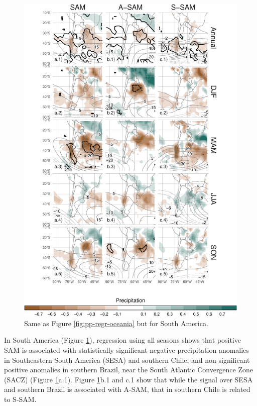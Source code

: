 \documentclass[smallextended]{svjour3}       %
\begin{document}
\begin{figure}
\includegraphics{pp-regr-america-1} \caption{Same as Figure \ref{fig:pp-regr-oceania} but for South America.}\label{fig:pp-regr-america}
\end{figure}

In South America (Figure \ref{fig:pp-regr-america}), regression using all seasons shows that positive SAM is associated with statistically significant negative precipitation anomalies in Southeastern South America (SESA) and southern Chile, and non-significant positive anomalies in southern Brazil, near the South Atlantic Convergence Zone (SACZ) (Figure \ref{fig:pp-regr-america}a.1).
Figure \ref{fig:pp-regr-america}b.1 and c.1 show that while the signal over SESA and southern Brazil is associated with A\nobreakdash-SAM, that in southern Chile is related to S\nobreakdash-SAM.
\end{document}
